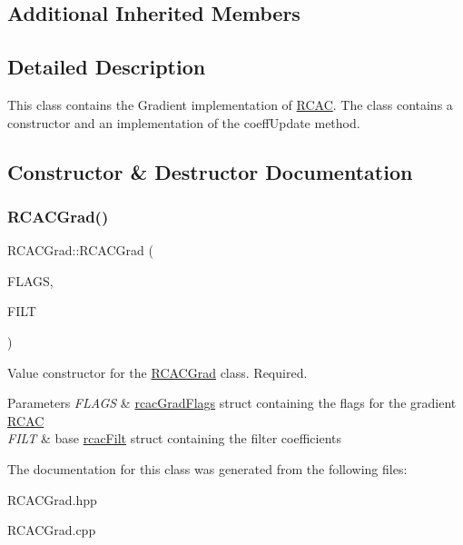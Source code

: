 \subsection*{Additional Inherited Members}


\subsection{Detailed Description}
This class contains the Gradient implementation of \hyperlink{class_r_c_a_c}{R\+C\+AC}. The class contains a constructor and an implementation of the coeff\+Update method. 

\subsection{Constructor \& Destructor Documentation}
\mbox{\label{class_r_c_a_c_grad_a62f433bc3efdfc5133105c5b2fd59ea6}} 
\subsubsection{\texorpdfstring{R\+C\+A\+C\+Grad()}{RCACGrad()}}
{\footnotesize\ttfamily R\+C\+A\+C\+Grad\+::\+R\+C\+A\+C\+Grad (\begin{DoxyParamCaption}\item[{\hyperlink{structrcac_grad_flags}{rcac\+Grad\+Flags} \&}]{F\+L\+A\+GS,  }\item[{\hyperlink{structrcac_filt}{rcac\+Filt} \&}]{F\+I\+LT }\end{DoxyParamCaption})}

Value constructor for the \hyperlink{class_r_c_a_c_grad}{R\+C\+A\+C\+Grad} class. Required.


\begin{DoxyParams}{Parameters}
{\em F\+L\+A\+GS} & \hyperlink{structrcac_grad_flags}{rcac\+Grad\+Flags} struct containing the flags for the gradient \hyperlink{class_r_c_a_c}{R\+C\+AC} \\
\hline
{\em F\+I\+LT} & base \hyperlink{structrcac_filt}{rcac\+Filt} struct containing the filter coefficients \\
\hline
\end{DoxyParams}


The documentation for this class was generated from the following files\+:\begin{DoxyCompactItemize}
\item 
R\+C\+A\+C\+Grad.\+hpp\item 
R\+C\+A\+C\+Grad.\+cpp\end{DoxyCompactItemize}
